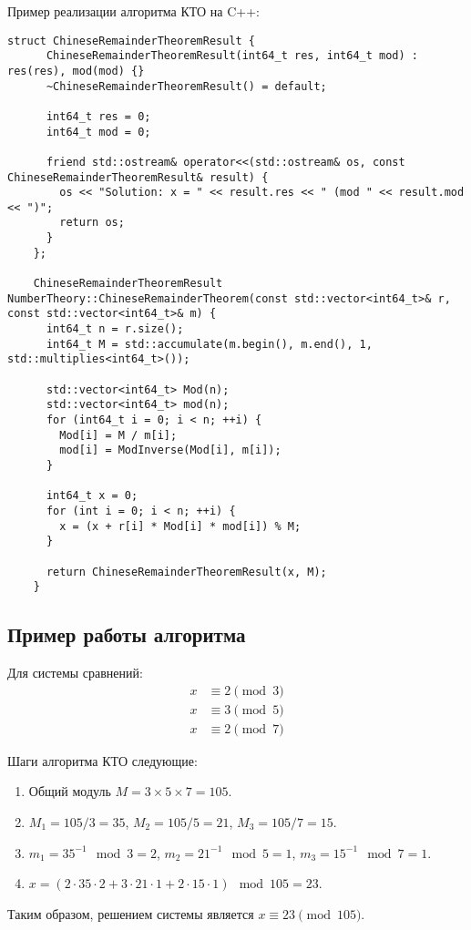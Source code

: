\documentclass[12pt, a4paper, openany]{book}
\begin{document}
\newpage
\noindent
    Пример реализации алгоритма КТО на C++:
    
\begin{lstlisting}[breaklines=true]
    struct ChineseRemainderTheoremResult {
      ChineseRemainderTheoremResult(int64_t res, int64_t mod) : res(res), mod(mod) {}
      ~ChineseRemainderTheoremResult() = default;
    
      int64_t res = 0;
      int64_t mod = 0;
    
      friend std::ostream& operator<<(std::ostream& os, const ChineseRemainderTheoremResult& result) {
        os << "Solution: x = " << result.res << " (mod " << result.mod << ")";
        return os;
      }
    };
    
    ChineseRemainderTheoremResult NumberTheory::ChineseRemainderTheorem(const std::vector<int64_t>& r, const std::vector<int64_t>& m) {
      int64_t n = r.size();
      int64_t M = std::accumulate(m.begin(), m.end(), 1, std::multiplies<int64_t>());
    
      std::vector<int64_t> Mod(n);
      std::vector<int64_t> mod(n);
      for (int64_t i = 0; i < n; ++i) {
        Mod[i] = M / m[i];
        mod[i] = ModInverse(Mod[i], m[i]);
      }
    
      int64_t x = 0;
      for (int i = 0; i < n; ++i) {
        x = (x + r[i] * Mod[i] * mod[i]) % M;
      }
    
      return ChineseRemainderTheoremResult(x, M);
    }
\end{lstlisting}

\subsection{Пример работы алгоритма}

Для системы сравнений:
    \[
    \begin{aligned}
    x &\equiv 2 \pmod{3} \\
    x &\equiv 3 \pmod{5} \\
    x &\equiv 2 \pmod{7}
    \end{aligned}
    \]

\noindent
    Шаги алгоритма КТО следующие:

\begin{enumerate}
    \item Общий модуль $M = 3 \times 5 \times 7 = 105$.
    \item $M_1 = 105/3 = 35$, $M_2 = 105/5 = 21$, $M_3 = 105/7 = 15$.
    \item $m_1 = 35^{-1} \mod 3 = 2$, $m_2 = 21^{-1} \mod 5 = 1$, $m_3 = 15^{-1} \mod 7 = 1$.
    \item $x = (2 \cdot 35 \cdot 2 + 3 \cdot 21 \cdot 1 + 2 \cdot 15 \cdot 1) \mod 105 = 23$.
\end{enumerate}

\noindent
    Таким образом, решением системы является $x \equiv 23 \pmod{105}$.
\end{document}
